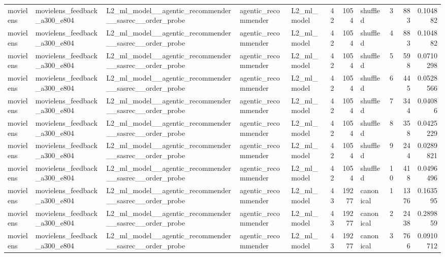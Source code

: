 \begin{table}[htbp!]
\begin{tabular}{lllllrrlrrr}
movielens & movielens\_feedback\_a300\_e804 & L2\_ml\_model\_\_agentic\_recommender\_\_sasrec\_\_order\_probe & agentic\_recommender & L2\_ml\_model & 42 & 1054 & shuffled & 3 & 883 & 0.104882 \\
movielens & movielens\_feedback\_a300\_e804 & L2\_ml\_model\_\_agentic\_recommender\_\_sasrec\_\_order\_probe & agentic\_recommender & L2\_ml\_model & 42 & 1054 & shuffled & 4 & 883 & 0.104882 \\
movielens & movielens\_feedback\_a300\_e804 & L2\_ml\_model\_\_agentic\_recommender\_\_sasrec\_\_order\_probe & agentic\_recommender & L2\_ml\_model & 42 & 1054 & shuffled & 5 & 598 & 0.0710298 \\
movielens & movielens\_feedback\_a300\_e804 & L2\_ml\_model\_\_agentic\_recommender\_\_sasrec\_\_order\_probe & agentic\_recommender & L2\_ml\_model & 42 & 1054 & shuffled & 6 & 445 & 0.0528566 \\
movielens & movielens\_feedback\_a300\_e804 & L2\_ml\_model\_\_agentic\_recommender\_\_sasrec\_\_order\_probe & agentic\_recommender & L2\_ml\_model & 42 & 1054 & shuffled & 7 & 344 & 0.04086 \\
movielens & movielens\_feedback\_a300\_e804 & L2\_ml\_model\_\_agentic\_recommender\_\_sasrec\_\_order\_probe & agentic\_recommender & L2\_ml\_model & 42 & 1054 & shuffled & 8 & 358 & 0.0425229 \\
movielens & movielens\_feedback\_a300\_e804 & L2\_ml\_model\_\_agentic\_recommender\_\_sasrec\_\_order\_probe & agentic\_recommender & L2\_ml\_model & 42 & 1054 & shuffled & 9 & 244 & 0.0289821 \\
movielens & movielens\_feedback\_a300\_e804 & L2\_ml\_model\_\_agentic\_recommender\_\_sasrec\_\_order\_probe & agentic\_recommender & L2\_ml\_model & 42 & 1054 & shuffled & 10 & 418 & 0.0496496 \\
movielens & movielens\_feedback\_a300\_e804 & L2\_ml\_model\_\_agentic\_recommender\_\_sasrec\_\_order\_probe & agentic\_recommender & L2\_ml\_model & 43 & 19277 & canonical & 1 & 1376 & 0.163595 \\
movielens & movielens\_feedback\_a300\_e804 & L2\_ml\_model\_\_agentic\_recommender\_\_sasrec\_\_order\_probe & agentic\_recommender & L2\_ml\_model & 43 & 19277 & canonical & 2 & 2438 & 0.289859 \\
movielens & movielens\_feedback\_a300\_e804 & L2\_ml\_model\_\_agentic\_recommender\_\_sasrec\_\_order\_probe & agentic\_recommender & L2\_ml\_model & 43 & 19277 & canonical & 3 & 766 & 0.0910712 \\

\end{tabular}
\end{table}
